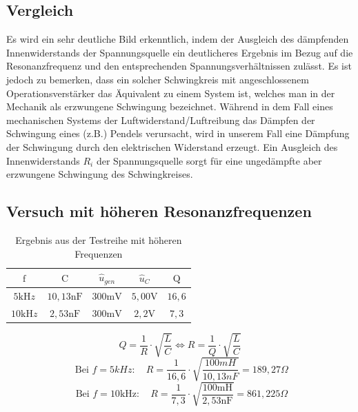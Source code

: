 \documentclass{article}
\begin{document}
\subsection{Vergleich}

Es wird ein sehr deutliche Bild erkenntlich, indem der Ausgleich des dämpfenden Innenwiderstands der
Spannungsquelle ein deutlicheres Ergebnis im Bezug auf die Resonanzfrequenz und den entsprechenden Spannungsverhältnissen zulässt.
Es ist jedoch zu bemerken, dass ein solcher Schwingkreis mit angeschlossenem Operationsverstärker das Äquivalent zu einem System ist, welches man
in der Mechanik als erzwungene Schwingung bezeichnet. Während in dem Fall eines mechanischen Systems der Luftwiderstand/Luftreibung das Dämpfen der Schwingung eines (z.B.)
Pendels verursacht, wird in unserem Fall eine Dämpfung der Schwingung durch den elektrischen Widerstand erzeugt. Ein Ausgleich des Innenwiderstands $R_i$ der Spannungsquelle sorgt 
für eine ungedämpfte aber erzwungene Schwingung des Schwingkreises.

\newpage
\subsection{Versuch mit höheren Resonanzfrequenzen}

\begin{table}[h]

  \begin{center}

    \begin{tabular}{|c|c|c|c|c|}
      \hline $\mathrm{f}$       & $\mathrm{C}$        & $\hat{u}_{g e n}$ & $\hat{u}_C$       & $\mathrm{Q}$ \\
      \hline $5 \mathrm{kH} z$  & $10,13 \mathrm{nF}$ & $300 \mathrm{mV}$ & $5,00 \mathrm{V}$ & $16,6$       \\
      \hline $10 \mathrm{kH} z$ & $2,53 \mathrm{nF}$  & $300 \mathrm{mV}$ & $2,2 \mathrm{V}$  & $7,3$        \\
      \hline
    \end{tabular}
    \caption{Ergebnis aus der Testreihe mit höheren Frequenzen}
    \label{tab:lCUQ}
  \end{center}
\end{table}
$$Q=\frac{1}{R} \cdot \sqrt{\frac{L}{C}} \Leftrightarrow R=\frac{1}{Q} \cdot \sqrt{\frac{L}{C}}$$
\begin{equation*}
  \text { Bei } f=5 k H z: \quad R=\frac{1}{16,6} \cdot \sqrt{\frac{100 m H}{10,13 n F}}=189,27 \Omega
\end{equation*}
\begin{equation*}
  \text { Bei } f=10 \mathrm{kHz}: \quad R=\frac{1}{7,3} \cdot \sqrt{\frac{100 \mathrm{mH}}{2,53 \mathrm{nF}}}=861,225 \Omega
\end{equation*}
\end{document}

